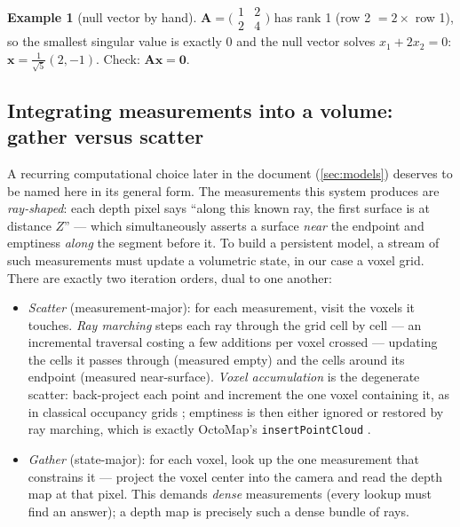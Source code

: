\documentclass[11pt]{article}
\theoremstyle{definition}
\newtheorem{example}{Example}
\newcommand{\mat}[1]{\mathbf{#1}}
\newcommand{\vect}[1]{\mathbf{#1}}
\newcommand{\code}[1]{\texttt{#1}}
\begin{document}
\begin{example}[null vector by hand]
\label{ex:nullvec}
$\mat A=\bigl(\begin{smallmatrix}1&2\\2&4\end{smallmatrix}\bigr)$ has rank 1
(row 2 $=2\times$ row 1), so the smallest singular value is exactly $0$ and
the null vector solves $x_1+2x_2=0$: $\vect x=\tfrac1{\sqrt5}(2,-1)$.
Check: $\mat A\vect x=\vect 0$.
\end{example}

\subsection{Integrating measurements into a volume: gather versus scatter}
\label{sec:gatherscatter}

A recurring computational choice later in the document
(\autoref{sec:models}) deserves to be named here in its general form.
The measurements this system produces are \emph{ray-shaped}: each depth
pixel says ``along this known ray, the first surface is at distance
$Z$'' --- which simultaneously asserts a surface \emph{near} the
endpoint and emptiness \emph{along} the segment before it. To build a
persistent model, a stream of such measurements must update a
volumetric state, in our case a voxel grid. There are exactly two
iteration orders, dual to one another:

\begin{itemize}
  \item \emph{Scatter} (measurement-major): for each measurement, visit
        the voxels it touches. \emph{Ray marching} steps each ray
        through the grid cell by cell --- an incremental traversal
        costing a few additions per voxel crossed \cite{Amanatides1987}
        --- updating the cells it passes through (measured empty) and
        the cells around its endpoint (measured near-surface).
        \emph{Voxel accumulation} is the degenerate scatter:
        back-project each point and increment the one voxel containing
        it, as in classical occupancy grids \cite{Elfes1989}; emptiness
        is then either ignored or restored by ray marching, which is
        exactly OctoMap's \code{insertPointCloud} \cite{Hornung2013}.
  \item \emph{Gather} (state-major): for each voxel, look up the one
        measurement that constrains it --- project the voxel center
        into the camera and read the depth map at that pixel. This
        demands \emph{dense} measurements (every lookup must find an
        answer); a depth map is precisely such a dense bundle of rays.
\end{itemize}
\end{document}

